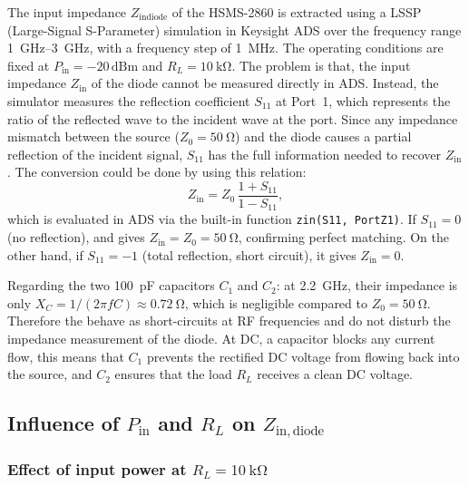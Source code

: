 The input impedance $Z_\mathrm{indiode}$ of the HSMS-2860 is extracted using
a LSSP (Large-Signal S-Parameter) simulation in Keysight ADS over the
frequency range \SIrange{1}{3}{\giga\hertz}, with a frequency step of
\SI{1}{\mega\hertz}.
The operating conditions are fixed at $P_\mathrm{in} = -20\,\text{dBm}$ and
$R_L = \SI{10}{\kilo\ohm}$.
The problem is that, the input impedance $Z_\mathrm{in}$ of the diode cannot be measured 
directly in ADS. Instead, the simulator measures the reflection 
coefficient $S_{11}$ at Port~1, which represents the ratio of the 
reflected wave to the incident wave at the port. Since any impedance 
mismatch between the source ($Z_0 = \SI{50}{\ohm}$) and the diode 
causes a partial reflection of the incident signal, $S_{11}$ has 
the full information needed to recover $Z_\mathrm{in}$. The conversion could be done by using this relation:
%
\begin{equation}
    Z_\mathrm{in} = Z_0 \,\frac{1 + S_{11}}{1 - S_{11}},
    \label{eq:zin_from_s11}
\end{equation}
%
which is evaluated in ADS via the built-in function 
\texttt{zin(S11, PortZ1)}.
If $S_{11} = 0$ (no reflection), 
and gives $Z_\mathrm{in} = Z_0 = 
\SI{50}{\ohm}$, confirming perfect matching. On the other hand, if $S_{11} = -1$ 
(total reflection, short circuit), it gives $Z_\mathrm{in} = 0$.

Regarding the two \SI{100}{\pico\farad} capacitors $C_1$ and $C_2$: 
at \SI{2.2}{\giga\hertz}, their impedance is only
$X_C = 1/(2\pi f C) \approx \SI{0.72}{\ohm}$, which is negligible 
compared to $Z_0 = \SI{50}{\ohm}$. Therefore the behave as 
short-circuits at RF frequencies and do not disturb the impedance 
measurement of the diode. At DC, a capacitor blocks any 
current flow, this means that $C_1$ prevents the 
rectified DC voltage from flowing back into the source, and $C_2$ 
ensures that the load $R_L$ receives a clean DC voltage.

\subsection{Influence of \texorpdfstring{$P_\mathrm{in}$}{Pin} and
            \texorpdfstring{$R_L$}{RL} on \texorpdfstring{$Z_\mathrm{in,diode}$}{Zin}}
\label{subsec:zin_tables}

\subsubsection{Effect of input power at \texorpdfstring{$R_L = \SI{10}{\kilo\ohm}$}{RL=10kohm}}

